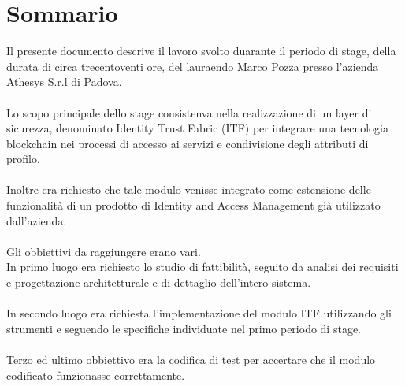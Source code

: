 
\cleardoublepage
{}
{}
\begingroup
\let\clearpage\relax
\let\cleardoublepage\relax
\let\cleardoublepage\relax

\chapter*{Sommario}

Il presente documento descrive il lavoro svolto duarante il periodo di stage, della durata di circa trecentoventi ore, del lauraendo Marco Pozza presso l'azienda Athesys S.r.l di Padova.\\\\
Lo scopo principale dello stage consistenva nella realizzazione di un layer di sicurezza, denominato Identity Trust Fabric (ITF) per integrare una tecnologia blockchain nei processi di accesso ai servizi e condivisione degli attributi di profilo.\\\\
Inoltre era richiesto che tale modulo venisse integrato come estensione delle funzionalità di un prodotto di Identity and Access Management già utilizzato dall'azienda.\\\\
Gli obbiettivi da raggiungere erano vari.\\
In primo luogo era richiesto lo studio di fattibilità, seguito da analisi dei requisiti e progettazione architetturale e di dettaglio dell'intero sistema.\\\\
In secondo luogo era richiesta l'implementazione del modulo ITF utilizzando gli strumenti e seguendo le specifiche individuate nel primo periodo di stage.\\\\
Terzo ed ultimo obbiettivo era la codifica di test per accertare che il modulo codificato funzionasse correttamente.

%
%

\endgroup			

\vfill


